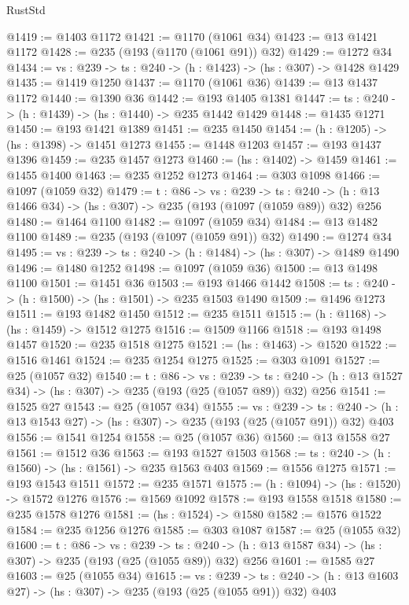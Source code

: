 \begin{lexlean}{RustStd}
\begin{coremodule}
@1419 := @1403 @1172
@1421 := @1170 (@1061 @34)
@1423 := @13 @1421 @1172
@1428 := @235 (@193 (@1170 (@1061 @91)) @32)
@1429 := @1272 @34
@1434 := {vs : @239} -> {ts : @240} -> (h : @1423) -> (hs : @307) -> @1428 @1429
@1435 := @1419 @1250
@1437 := @1170 (@1061 @36)
@1439 := @13 @1437 @1172
@1440 := @1390 @36
@1442 := @193 @1405 @1381
@1447 := {ts : @240} -> (h : @1439) -> (hs : @1440) -> @235 @1442 @1429
@1448 := @1435 @1271
@1450 := @193 @1421 @1389
@1451 := @235 @1450
@1454 := (h : @1205) -> (hs : @1398) -> @1451 @1273
@1455 := @1448 @1203
@1457 := @193 @1437 @1396
@1459 := @235 @1457 @1273
@1460 := (hs : @1402) -> @1459
@1461 := @1455 @1400
@1463 := @235 @1252 @1273
@1464 := @303 @1098
@1466 := @1097 (@1059 @32)
@1479 := {t : @86} ->
  {vs : @239} ->
  {ts : @240} -> (h : @13 @1466 @34) -> (hs : @307) -> @235 (@193 (@1097 (@1059 @89)) @32) @256
@1480 := @1464 @1100
@1482 := @1097 (@1059 @34)
@1484 := @13 @1482 @1100
@1489 := @235 (@193 (@1097 (@1059 @91)) @32)
@1490 := @1274 @34
@1495 := {vs : @239} -> {ts : @240} -> (h : @1484) -> (hs : @307) -> @1489 @1490
@1496 := @1480 @1252
@1498 := @1097 (@1059 @36)
@1500 := @13 @1498 @1100
@1501 := @1451 @36
@1503 := @193 @1466 @1442
@1508 := {ts : @240} -> (h : @1500) -> (hs : @1501) -> @235 @1503 @1490
@1509 := @1496 @1273
@1511 := @193 @1482 @1450
@1512 := @235 @1511
@1515 := (h : @1168) -> (hs : @1459) -> @1512 @1275
@1516 := @1509 @1166
@1518 := @193 @1498 @1457
@1520 := @235 @1518 @1275
@1521 := (hs : @1463) -> @1520
@1522 := @1516 @1461
@1524 := @235 @1254 @1275
@1525 := @303 @1091
@1527 := @25 (@1057 @32)
@1540 := {t : @86} ->
  {vs : @239} ->
  {ts : @240} -> (h : @13 @1527 @34) -> (hs : @307) -> @235 (@193 (@25 (@1057 @89)) @32) @256
@1541 := @1525 @27
@1543 := @25 (@1057 @34)
@1555 := {vs : @239} ->
  {ts : @240} -> (h : @13 @1543 @27) -> (hs : @307) -> @235 (@193 (@25 (@1057 @91)) @32) @403
@1556 := @1541 @1254
@1558 := @25 (@1057 @36)
@1560 := @13 @1558 @27
@1561 := @1512 @36
@1563 := @193 @1527 @1503
@1568 := {ts : @240} -> (h : @1560) -> (hs : @1561) -> @235 @1563 @403
@1569 := @1556 @1275
@1571 := @193 @1543 @1511
@1572 := @235 @1571
@1575 := (h : @1094) -> (hs : @1520) -> @1572 @1276
@1576 := @1569 @1092
@1578 := @193 @1558 @1518
@1580 := @235 @1578 @1276
@1581 := (hs : @1524) -> @1580
@1582 := @1576 @1522
@1584 := @235 @1256 @1276
@1585 := @303 @1087
@1587 := @25 (@1055 @32)
@1600 := {t : @86} ->
  {vs : @239} ->
  {ts : @240} -> (h : @13 @1587 @34) -> (hs : @307) -> @235 (@193 (@25 (@1055 @89)) @32) @256
@1601 := @1585 @27
@1603 := @25 (@1055 @34)
@1615 := {vs : @239} ->
  {ts : @240} -> (h : @13 @1603 @27) -> (hs : @307) -> @235 (@193 (@25 (@1055 @91)) @32) @403

\end{coremodule}
\end{lexlean}
